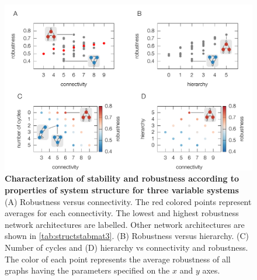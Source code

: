 




\begin{figure}[!ht]
\centering
\noindent\includegraphics[width=1.0\columnwidth]{fig/combinedfigs.pdf}
\caption{{\bf Characterization of stability and robustness according to properties of system structure for three variable systems} (A) Robustness versus connectivity. The red colored points represent averages for each connectivity. The lowest and highest robustness network architectures are labelled. Other network architectures are shown in \ref{tab:structstabmat3}. (B) Robustness versus hierarchy. (C) Number of cycles and (D) hierarchy vs connectivity and robustness. The color of each point represents the average robustness of all graphs having the parameters specified on the $x$ and $y$ axes.
}
\label{fig:combined}
\end{figure}

